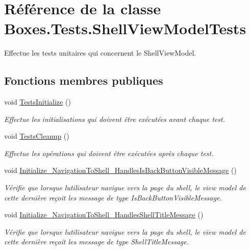 \hypertarget{class_boxes_1_1_tests_1_1_shell_view_model_tests}{}\section{Référence de la classe Boxes.\+Tests.\+Shell\+View\+Model\+Tests}
\label{class_boxes_1_1_tests_1_1_shell_view_model_tests}


Effectue les tests unitaires qui concernent le Shell\+View\+Model.  


\subsection*{Fonctions membres publiques}
\begin{DoxyCompactItemize}
\item 
void \hyperlink{class_boxes_1_1_tests_1_1_shell_view_model_tests_aa92aa42e4d785935fac8f9661a81fec9}{Tests\+Initialize} ()
\begin{DoxyCompactList}\small\item\em Effectue les initialisations qui doivent être exécutées avant chaque test. \end{DoxyCompactList}\item 
void \hyperlink{class_boxes_1_1_tests_1_1_shell_view_model_tests_add870a32e8df2f26e484a4c3ca93ca7e}{Tests\+Cleanup} ()
\begin{DoxyCompactList}\small\item\em Effectue les opérations qui doivent être exécutées après chaque test. \end{DoxyCompactList}\item 
void \hyperlink{class_boxes_1_1_tests_1_1_shell_view_model_tests_a405a7fc3e95313c7a15161e4ea211778}{Initialize\+\_\+\+Navigation\+To\+Shell\+\_\+\+Handles\+Is\+Back\+Button\+Visible\+Message} ()
\begin{DoxyCompactList}\small\item\em Vérifie que lorsque l\textquotesingle{}utilisateur navigue vers la page du shell, le view model de cette dernière reçoit les message de type Is\+Back\+Button\+Visible\+Message. \end{DoxyCompactList}\item 
void \hyperlink{class_boxes_1_1_tests_1_1_shell_view_model_tests_a86fafe83f9e6924180e5017673f4ee19}{Initialize\+\_\+\+Navigation\+To\+Shell\+\_\+\+Handles\+Shell\+Title\+Message} ()
\begin{DoxyCompactList}\small\item\em Vérifie que lorsque l\textquotesingle{}utilisateur navigue vers la page du shell, le view model de cette dernière reçoit les message de type Shell\+Title\+Message. \end{DoxyCompactList}\item 

\end{DoxyCompactItemize}
